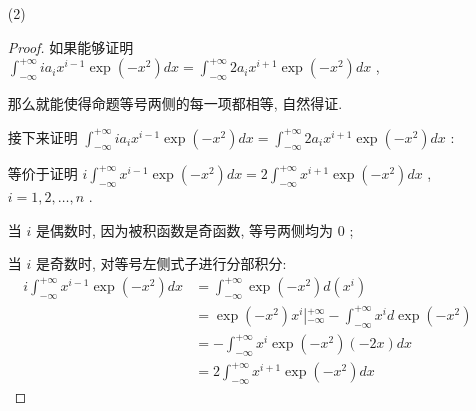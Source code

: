 \documentclass{article}
\begin{document}
\begin{enumerate}
\begin{enumerate}
\begin{proof}
            $\forall x=0,1,2,\dots,n$ , 有:
            \begin{equation}
                \begin{aligned}
                    \lim_{x\rightarrow\pm\infty}\frac{a_ix^i\exp(-x^2)}{\frac{1}{x^2}}
                    &=a_i\lim_{x\rightarrow\pm\infty}\frac{x^{1+i+\epsilon}}{\exp(x^2)} \\
                    &=\frac{a_i(1+i+\epsilon)}{2}\lim_{x\rightarrow\pm\infty}\frac{x^{i+\epsilon-1}}{\exp(x^2)} \\
                    &=\dots \\
                    &=0
                \end{aligned}
                \nonumber
            \end{equation}
            再根据积分的可加性可知 $f(x)$ 的每一项按照题干中的式子积分后均收敛, \par
            因此 $\int_{-\infty}^{+\infty}f(x)\exp(-x^2)dx$ 收敛.
        \end{proof}
        \item[(2)] \begin{proof}
            如果能够证明 $\int_{-\infty}^{+\infty}ia_ix^{i-1}\exp(-x^2)dx=\int_{-\infty}^{+\infty}2a_ix^{i+1}\exp(-x^2)dx$ , \par
            那么就能使得命题等号两侧的每一项都相等, 自然得证. \par
            接下来证明 $\int_{-\infty}^{+\infty}ia_ix^{i-1}\exp(-x^2)dx=\int_{-\infty}^{+\infty}2a_ix^{i+1}\exp(-x^2)dx$ : \par
            等价于证明 $i\int_{-\infty}^{+\infty}x^{i-1}\exp(-x^2)dx=2\int_{-\infty}^{+\infty}x^{i+1}\exp(-x^2)dx$ , $i=1,2,\dots,n$ . \par
            当 $i$ 是偶数时, 因为被积函数是奇函数, 等号两侧均为 $0$ ; \par
            当 $i$ 是奇数时, 对等号左侧式子进行分部积分: 
            \begin{equation}
                \begin{aligned}
                    i\int_{-\infty}^{+\infty}x^{i-1}\exp(-x^2)dx
                    &=\int_{-\infty}^{+\infty}\exp(-x^2)d(x^i) \\
                    &=\exp(-x^2)x^i\left|_{-\infty}^{+\infty}\right.-\int_{-\infty}^{+\infty}x^id\exp(-x^2) \\
                    &=-\int_{-\infty}^{+\infty}x^i\exp(-x^2)(-2x)dx \\
                    &=2\int_{-\infty}^{+\infty}x^{i+1}\exp(-x^2)dx

\end{aligned}
\end{equation}
\end{proof}
\end{enumerate}
\end{enumerate}
\end{document}
